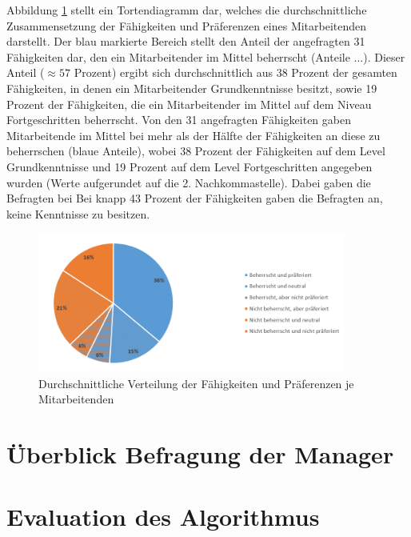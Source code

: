 Abbildung \ref{fig:ergebnisse:abb1} stellt ein Tortendiagramm dar, welches die durchschnittliche Zusammensetzung der Fähigkeiten und Präferenzen eines Mitarbeitenden darstellt.
Der blau markierte Bereich stellt den Anteil der angefragten 31 Fähigkeiten dar, den ein Mitarbeitender im Mittel beherrscht (Anteile ...).
Dieser Anteil ($\approx 57$ Prozent) ergibt sich durchschnittlich aus 38 Prozent der gesamten Fähigkeiten, in denen ein Mitarbeitender Grundkenntnisse besitzt, sowie 19 Prozent der Fähigkeiten, die ein Mitarbeitender im Mittel auf dem Niveau Fortgeschritten beherrscht.
Von den 31 angefragten Fähigkeiten gaben Mitarbeitende im Mittel bei mehr als der Hälfte der Fähigkeiten an diese zu beherrschen (blaue Anteile), wobei 38 Prozent der Fähigkeiten auf dem Level Grundkenntnisse und 19 Prozent auf dem Level Fortgeschritten angegeben wurden (Werte aufgerundet auf die 2. Nachkommastelle).
Dabei gaben die Befragten bei 
Bei knapp 43 Prozent der Fähigkeiten gaben die Befragten an, keine Kenntnisse zu besitzen.
\begin{figure}[H]
    \centering
	\includegraphics[width=0.9\textwidth]{gfx/verteilung-f-p.png}
	\caption[Durchschnittliche Verteilung der Fähigkeiten und Präferenzen je Mitarbeitenden]{Durchschnittliche Verteilung der Fähigkeiten und Präferenzen je Mitarbeitenden}
	\label{fig:ergebnisse:abb1}
\end{figure}

\section{Überblick Befragung der Manager}

\section{Evaluation des Algorithmus}

